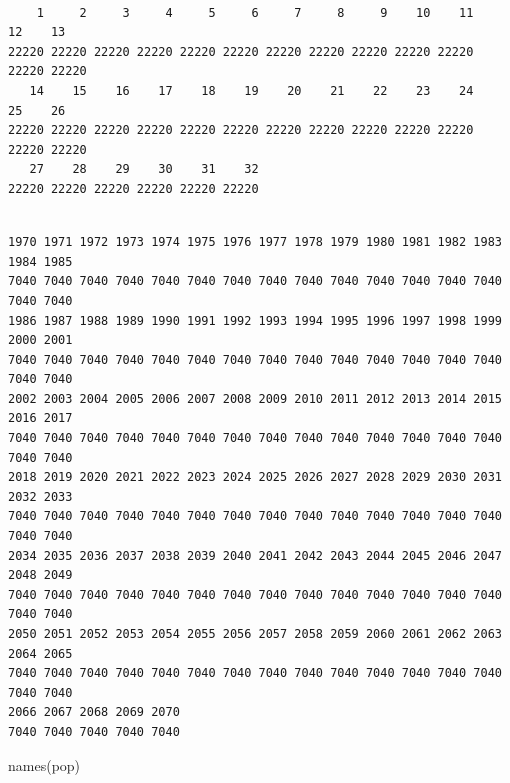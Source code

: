 \documentclass[
  letterpaper,
  DIV=11,
  numbers=noendperiod]{scrartcl}
\newenvironment{Shaded}{\begin{snugshade}}{\end{snugshade}}
\newcommand{\FunctionTok}[1]{\textcolor[rgb]{0.28,0.35,0.67}{#1}}
\newcommand{\NormalTok}[1]{\textcolor[rgb]{0.00,0.23,0.31}{#1}}
\newcommand{\SpecialCharTok}[1]{\textcolor[rgb]{0.37,0.37,0.37}{#1}}
\begin{document}
\begin{Shaded}
\end{Shaded}

\begin{verbatim}

    1     2     3     4     5     6     7     8     9    10    11    12    13 
22220 22220 22220 22220 22220 22220 22220 22220 22220 22220 22220 22220 22220 
   14    15    16    17    18    19    20    21    22    23    24    25    26 
22220 22220 22220 22220 22220 22220 22220 22220 22220 22220 22220 22220 22220 
   27    28    29    30    31    32 
22220 22220 22220 22220 22220 22220 
\end{verbatim}

\begin{Shaded}
\end{Shaded}

\begin{verbatim}

1970 1971 1972 1973 1974 1975 1976 1977 1978 1979 1980 1981 1982 1983 1984 1985 
7040 7040 7040 7040 7040 7040 7040 7040 7040 7040 7040 7040 7040 7040 7040 7040 
1986 1987 1988 1989 1990 1991 1992 1993 1994 1995 1996 1997 1998 1999 2000 2001 
7040 7040 7040 7040 7040 7040 7040 7040 7040 7040 7040 7040 7040 7040 7040 7040 
2002 2003 2004 2005 2006 2007 2008 2009 2010 2011 2012 2013 2014 2015 2016 2017 
7040 7040 7040 7040 7040 7040 7040 7040 7040 7040 7040 7040 7040 7040 7040 7040 
2018 2019 2020 2021 2022 2023 2024 2025 2026 2027 2028 2029 2030 2031 2032 2033 
7040 7040 7040 7040 7040 7040 7040 7040 7040 7040 7040 7040 7040 7040 7040 7040 
2034 2035 2036 2037 2038 2039 2040 2041 2042 2043 2044 2045 2046 2047 2048 2049 
7040 7040 7040 7040 7040 7040 7040 7040 7040 7040 7040 7040 7040 7040 7040 7040 
2050 2051 2052 2053 2054 2055 2056 2057 2058 2059 2060 2061 2062 2063 2064 2065 
7040 7040 7040 7040 7040 7040 7040 7040 7040 7040 7040 7040 7040 7040 7040 7040 
2066 2067 2068 2069 2070 
7040 7040 7040 7040 7040 
\end{verbatim}

\begin{Shaded}
\begin{Highlighting}[]
\FunctionTok{names}\NormalTok{(pop)}
\end{Highlighting}
\end{Shaded}
\end{document}
